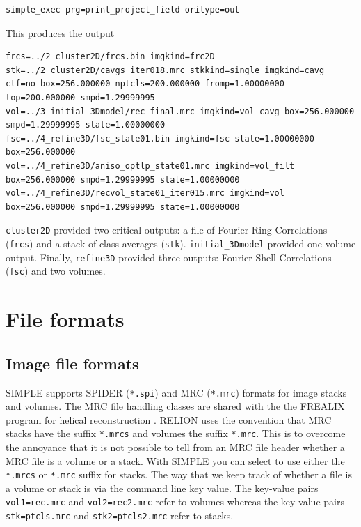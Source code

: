 \documentclass[a4paper,11pt]{article}
\newcommand{\prgname}[1]{\textcolor{NavyBlue}{\texttt{#1}}}
\begin{document}
\begin{Verbatim}[commandchars=+\[\],fontsize=\small,breaklines=true]
simple_exec prg=print_project_field oritype=out
\end{Verbatim}

\noindent{}This produces the output

\begin{Verbatim}[commandchars=+\[\],fontsize=\small,breaklines=true]
frcs=../2_cluster2D/frcs.bin imgkind=frc2D
stk=../2_cluster2D/cavgs_iter018.mrc stkkind=single imgkind=cavg ctf=no box=256.000000 nptcls=200.000000 fromp=1.00000000 top=200.000000 smpd=1.29999995
vol=../3_initial_3Dmodel/rec_final.mrc imgkind=vol_cavg box=256.000000 smpd=1.29999995 state=1.00000000
fsc=../4_refine3D/fsc_state01.bin imgkind=fsc state=1.00000000 box=256.000000
vol=../4_refine3D/aniso_optlp_state01.mrc imgkind=vol_filt box=256.000000 smpd=1.29999995 state=1.00000000
vol=../4_refine3D/recvol_state01_iter015.mrc imgkind=vol box=256.000000 smpd=1.29999995 state=1.00000000
\end{Verbatim}

\noindent{}\prgname{cluster2D} provided two critical outputs: a file of Fourier Ring Correlations (\texttt{frcs}) and a stack of class averages (\texttt{stk}). \prgname{initial\_3Dmodel} provided one volume output. Finally, \prgname{refine3D} provided three outputs: Fourier Shell Correlations (\texttt{fsc}) and two volumes. 





\section{File formats}

\subsection{Image file formats}
SIMPLE supports SPIDER (\texttt{*.spi}) and MRC (\texttt{*.mrc}) formats for image stacks and volumes. The MRC file handling classes are shared with the the FREALIX program for helical reconstruction \citep{Rohou:2014aa}. RELION \citep{Scheres:2012aa} uses the convention that MRC stacks have the suffix \texttt{*.mrcs} and volumes the suffix \texttt{*.mrc}. This is to overcome the annoyance that it is not possible to tell from an MRC file header whether a MRC file is a volume or a stack. With SIMPLE you can select to use either the \texttt{*.mrcs} or \texttt{*.mrc} suffix for stacks. The way that we keep track of whether a file is a volume or stack is via the command line key value. The key-value pairs \texttt{vol1=rec.mrc} and \texttt{vol2=rec2.mrc} refer to volumes whereas the key-value pairs \texttt{stk=ptcls.mrc} and \texttt{stk2=ptcls2.mrc} refer to stacks.
\end{document}
